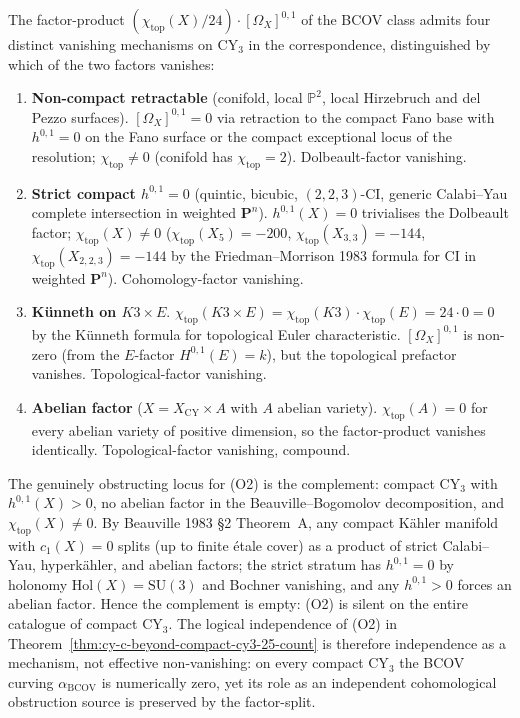 \begin{proposition}
\label{prop:cy-c-beyond-bcov-factor-split}
The factor-product $(\chi_{\mathrm{top}}(X)/24) \cdot [\Omega_X]^{0,1}$
of the BCOV class admits four distinct vanishing mechanisms on CY$_3$
in the correspondence, distinguished by which of the two factors vanishes:
\begin{enumerate}[label=\textup{(F\roman*)}]
 \item \textbf{Non-compact retractable}
 (conifold, local $\mathbb P^2$, local Hirzebruch and del Pezzo surfaces).
 $[\Omega_X]^{0,1} = 0$ via retraction to the compact Fano base
 with $h^{0,1} = 0$ on the Fano surface or the compact exceptional
 locus of the resolution; $\chi_{\mathrm{top}} \neq 0$ (conifold
 has $\chi_{\mathrm{top}} = 2$). Dolbeault-factor vanishing.
 \item \textbf{Strict compact $h^{0,1} = 0$} (quintic, bicubic,
 $(2,2,3)$-CI, generic Calabi--Yau complete intersection in
 weighted $\mathbf P^n$). $h^{0,1}(X) = 0$ trivialises the
 Dolbeault factor; $\chi_{\mathrm{top}}(X) \neq 0$
 ($\chi_{\mathrm{top}}(X_5) = -200$,
 $\chi_{\mathrm{top}}(X_{3,3}) = -144$,
 $\chi_{\mathrm{top}}(X_{2,2,3}) = -144$ by the
 Friedman--Morrison 1983 formula for CI in weighted $\mathbf P^n$).
 Cohomology-factor vanishing.
 \item \textbf{K\"unneth on $K3 \times E$}.
 $\chi_{\mathrm{top}}(K3 \times E) = \chi_{\mathrm{top}}(K3) \cdot
 \chi_{\mathrm{top}}(E) = 24 \cdot 0 = 0$ by the K\"unneth
 formula for topological Euler characteristic.
 $[\Omega_X]^{0,1}$ is non-zero (from the $E$-factor
 $H^{0,1}(E) = k$), but the topological prefactor vanishes.
 Topological-factor vanishing.
 \item \textbf{Abelian factor}
 ($X = X_{\mathrm{CY}} \times A$ with $A$ abelian variety).
 $\chi_{\mathrm{top}}(A) = 0$ for every abelian variety of
 positive dimension, so the factor-product vanishes identically.
 Topological-factor vanishing, compound.
\end{enumerate}
The genuinely obstructing locus for (O2) is the complement: compact
CY$_3$ with $h^{0,1}(X) > 0$, no abelian factor in the
Beauville--Bogomolov decomposition, and $\chi_{\mathrm{top}}(X) \neq 0$.
By Beauville 1983 \S 2 Theorem~A, any compact K\"ahler manifold with
$c_1(X) = 0$ splits (up to finite \'etale cover) as a product of
strict Calabi--Yau, hyperk\"ahler, and abelian factors; the
strict stratum has $h^{0,1} = 0$ by holonomy $\mathrm{Hol}(X) =
\mathrm{SU}(3)$ and Bochner vanishing, and any $h^{0,1} > 0$ forces an
abelian factor. Hence the complement is empty: (O2) is silent on the
entire catalogue of compact CY$_3$. The logical independence
of (O2) in Theorem~\ref{thm:cy-c-beyond-compact-cy3-25-count} is
therefore independence as a mechanism, not effective non-vanishing: on
every compact CY$_3$ the BCOV curving $\alpha_{\mathrm{BCOV}}$ is
numerically zero, yet its role as an independent cohomological
obstruction source is preserved by the factor-split.
\end{proposition}

